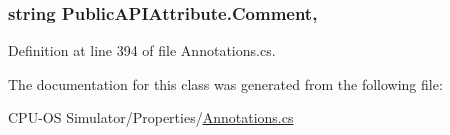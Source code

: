 \subsubsection[{Comment}]{\setlength{\rightskip}{0pt plus 5cm}string Public\+A\+P\+I\+Attribute.\+Comment\hspace{0.3cm}{\ttfamily [get]}, {}}\label{class_public_a_p_i_attribute_a4488351c8b5d0090c2bf8d69380acf6a}


Definition at line 394 of file Annotations.\+cs.



The documentation for this class was generated from the following file\+:\begin{DoxyCompactItemize}
\item 
C\+P\+U-\/\+O\+S Simulator/\+Properties/\hyperlink{_annotations_8cs}{Annotations.\+cs}\end{DoxyCompactItemize}
